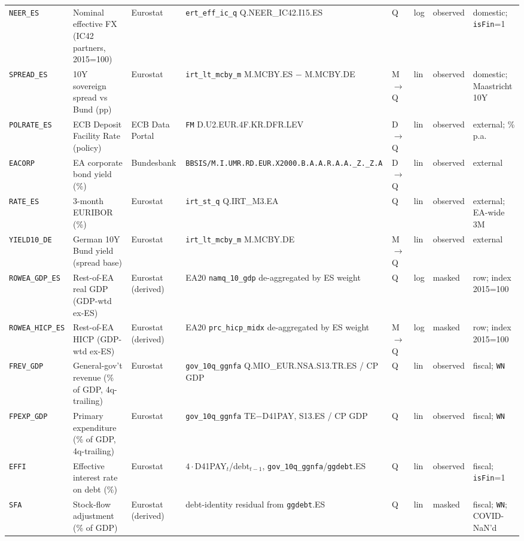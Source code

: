 \begin{longtable}{@{}p{}p{}p{}p{}p{}p{}p{}p{}@{}}
\texttt{NEER\_ES}  & Nominal effective FX (IC42 partners, 2015=100) & Eurostat & \texttt{ert\_eff\_ic\_q} Q.NEER\_IC42.I15.ES & Q & log & observed & domestic; \texttt{isFin}=1 \\
\texttt{SPREAD\_ES}& 10Y sovereign spread vs Bund (pp) & Eurostat & \texttt{irt\_lt\_mcby\_m} M.MCBY.ES $-$ M.MCBY.DE & M$\to$Q & lin & observed & domestic; Maastricht 10Y \\
\texttt{POLRATE\_ES}& ECB Deposit Facility Rate (policy) & ECB Data Portal & \texttt{FM} D.\allowbreak U2.\allowbreak EUR.\allowbreak 4F.\allowbreak KR.\allowbreak DFR.\allowbreak LEV & D$\to$Q & lin & observed & external; \% p.a. \\
\texttt{EACORP}    & EA corporate bond yield (\%) & Bundesbank & \texttt{BBSIS/\allowbreak M.\allowbreak I.\allowbreak UMR.\allowbreak RD.\allowbreak EUR.\allowbreak X2000.\allowbreak B.A.A.\allowbreak R.A.A.\allowbreak \_Z.\_Z.A} & D$\to$Q & lin & observed & external \\
\texttt{RATE\_ES}  & 3-month EURIBOR (\%) & Eurostat & \texttt{irt\_st\_q} Q.IRT\_M3.EA & Q & lin & observed & external; EA-wide 3M \\
\texttt{YIELD10\_DE}& German 10Y Bund yield (spread base) & Eurostat & \texttt{irt\_lt\_mcby\_m} M.MCBY.DE & M$\to$Q & lin & observed & external \\
\texttt{ROWEA\_GDP\_ES}  & Rest-of-EA real GDP (GDP-wtd ex-ES) & Eurostat (derived) & EA20 \texttt{namq\_10\_gdp} de-aggregated by ES weight & Q & log & masked & row; index 2015=100 \\
\texttt{ROWEA\_HICP\_ES} & Rest-of-EA HICP (GDP-wtd ex-ES) & Eurostat (derived) & EA20 \texttt{prc\_hicp\_midx} de-aggregated by ES weight & M$\to$Q & log & masked & row; index 2015=100 \\
\texttt{FREV\_GDP} & General-gov't revenue (\% of GDP, 4q-trailing) & Eurostat & \texttt{gov\_10q\_ggnfa} Q.\allowbreak MIO\_EUR.\allowbreak NSA.\allowbreak S13.\allowbreak TR.\allowbreak ES / CP GDP & Q & lin & observed & fiscal; \texttt{WN} \\
\texttt{FPEXP\_GDP}& Primary expenditure (\% of GDP, 4q-trailing) & Eurostat & \texttt{gov\_10q\_ggnfa} TE$-$D41PAY, S13.ES / CP GDP & Q & lin & observed & fiscal; \texttt{WN} \\
\texttt{EFFI}      & Effective interest rate on debt (\%) & Eurostat & $4\cdot$D41PAY$_t$/debt$_{t-1}$, \texttt{gov\_10q\_ggnfa}/\texttt{ggdebt}.ES & Q & lin & observed & fiscal; \texttt{isFin}=1 \\
\texttt{SFA}       & Stock-flow adjustment (\% of GDP) & Eurostat (derived) & debt-identity residual from \texttt{ggdebt}.ES & Q & lin & masked & fiscal; \texttt{WN}; COVID-NaN'd \\

\end{longtable}
